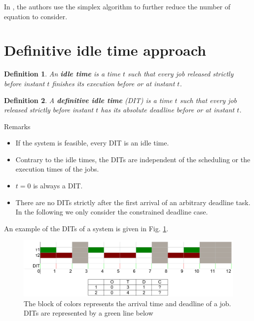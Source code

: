 \documentclass[a4paper,10pt]{article}
\newtheorem{definition}{Definition}
\begin{document}
In \cite{lipariaverage}, the authors use the simplex algorithm to further reduce the number of equation to consider.

\section{Definitive idle time approach}
\label{sct:DIT}

\begin{definition}
An \textbf{idle time} is a time $t$ such that every job released strictly before instant $t$ finishes its execution before  or at instant $t$.\\
\end{definition}

\begin{definition}
A \textbf{definitive idle time} (DIT) is a time $t$ such that every job released strictly before instant $t$ has its absolute deadline before or at instant $t$.\\
\end{definition}

Remarks
 \begin{itemize}
  \item If the system is feasible, every DIT is an idle time.
  \item Contrary to the idle times, the DITs are independent of the scheduling or the execution times of the jobs.
  \item $t=0$ is always a DIT.
  \item There are no DITs strictly after the first arrival of an arbitrary deadline task. In the following we only consider the constrained deadline case.
 \end{itemize}

 An example of the DITs of a system is given in Fig. \ref{fig:ditExample}.

 \begin{figure}[h]
\begin{center}
\includegraphics[width=\textwidth]{figs/dit_example.png}
\caption{The block of colors represents the arrival time and deadline of a job. DITs are represented by a green line below}
\label{fig:ditExample}
\end{center}
\end{figure}
\end{document}
